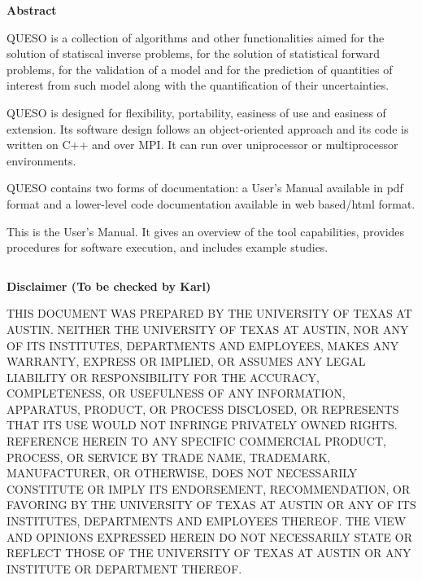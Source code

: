 \clearpage
\centerline{\Large\bf Abstract}
$~$\\
QUESO is a collection of algorithms and other functionalities aimed
for the solution of statiscal inverse problems, for the solution of
statistical forward problems, for the validation of a model and for
the prediction of quantities of interest from such model along with
the quantification of their uncertainties.

QUESO is designed for flexibility, portability, easiness of use and
easiness of extension. Its software design follows an object-oriented
approach and its code is written on C++ and over MPI. It can run over
uniprocessor or multiprocessor environments.

QUESO contains two forms of documentation:
a User's Manual available in pdf format
and
a lower-level code documentation available in web based/html format.

This is the User's Manual.
It gives an overview of the tool capabilities,
provides procedures for software execution, and includes example studies.

\clearpage
$~$\\

\clearpage
\centerline{\Large\bf Disclaimer (To be checked by Karl)}
$~$\\
    THIS DOCUMENT WAS PREPARED
    BY THE UNIVERSITY OF TEXAS AT AUSTIN.
    NEITHER THE UNIVERSITY OF TEXAS
    AT AUSTIN, NOR ANY OF ITS INSTITUTES, DEPARTMENTS AND EMPLOYEES, MAKES ANY WARRANTY, EXPRESS OR IMPLIED,
    OR ASSUMES ANY LEGAL LIABILITY OR RESPONSIBILITY FOR THE ACCURACY, COMPLETENESS, OR
    USEFULNESS OF ANY INFORMATION, APPARATUS, PRODUCT, OR PROCESS DISCLOSED, OR REPRESENTS
    THAT ITS USE WOULD NOT INFRINGE PRIVATELY OWNED RIGHTS. REFERENCE HEREIN TO ANY SPECIFIC
    COMMERCIAL PRODUCT, PROCESS, OR SERVICE BY TRADE NAME, TRADEMARK, MANUFACTURER, OR OTHERWISE,
    DOES NOT NECESSARILY CONSTITUTE OR IMPLY ITS ENDORSEMENT, RECOMMENDATION, OR FAVORING BY
    THE UNIVERSITY OF TEXAS AT AUSTIN OR ANY OF ITS INSTITUTES, DEPARTMENTS AND EMPLOYEES THEREOF.
    THE VIEW AND OPINIONS EXPRESSED HEREIN DO NOT NECESSARILY STATE OR REFLECT
    THOSE OF THE UNIVERSITY OF TEXAS AT AUSTIN OR ANY INSTITUTE OR DEPARTMENT
    THEREOF.

